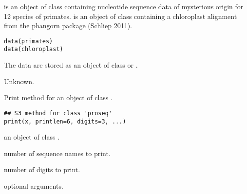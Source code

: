 \documentclass[a4paper]{book}
\begin{document}
%
\begin{SeeAlso}\relax
{}
\end{SeeAlso}
%
\begin{Examples}
\end{Examples}
%
\begin{Description}\relax
{} is an object of class  containing nucleotide sequence data of mysterious origin for 12 species of primates.  is an object of class containing a chloroplast alignment from the phangorn package (Schliep 2011).
\end{Description}
%
\begin{Usage}
\begin{verbatim}
data(primates)
data(chloroplast)
\end{verbatim}
\end{Usage}
%
\begin{Format}
The data are stored as an object of class  or .
\end{Format}
%
\begin{Source}\relax
Unknown.
\end{Source}
%
\begin{Description}\relax
Print method for an object of class .
\end{Description}
%
\begin{Usage}
\begin{verbatim}
## S3 method for class 'proseq'
print(x, printlen=6, digits=3, ...)
\end{verbatim}
\end{Usage}
%
\begin{Arguments}
\begin{ldescription}
\item[\code{x}] an object of class .
\item[\code{printlen}] number of sequence names to print.
\item[\code{digits}] number of digits to print.
\item[\code{...}] optional arguments.
\end{ldescription}
\end{Arguments}
\end{document}
